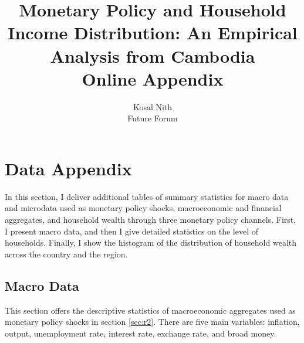 \documentclass[11pt,letterpaper]{article}
\begin{document}
	
\title{\textbf{Monetary Policy and Household Income Distribution: An Empirical Analysis from Cambodia \\
						Online Appendix}}
\author{Kosal Nith \\
						\small{Future Forum}  
					}
\maketitle
\appendix 
	\renewcommand*{\thepage}{A\arabic{page}}
	\renewcommand{\thetable}{A\arabic{table}}
	\renewcommand{\thefigure}{A\arabic{figure}}	
	
	\vspace{-3em}
	
\tableofcontents	

\section{Data Appendix}\label{app:b}
In this section, I deliver additional tables of summary statistics for macro data and microdata used as monetary policy shocks, macroeconomic and financial aggregates, and household wealth through three monetary policy channels. First, I present macro data, and then I give detailed statistics on the level of households. Finally, I show the histogram of the distribution of household wealth across the country and the region. 

	\subsection{Macro Data}\label{app:b1}
This section offers the descriptive statistics of macroeconomic aggregates used as monetary policy shocks in section \ref{sec:r2}. There are five main variables: inflation, output, unemployment rate, interest rate, exchange rate, and broad money. 
\end{document}
